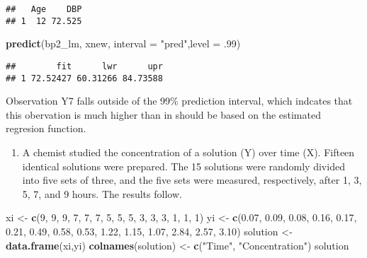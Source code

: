 \documentclass[
]{article}
\newenvironment{Shaded}{\begin{snugshade}}{\end{snugshade}}
\newcommand{\AttributeTok}[1]{\textcolor[rgb]{0.13,0.29,0.53}{#1}}
\newcommand{\DecValTok}[1]{\textcolor[rgb]{0.00,0.00,0.81}{#1}}
\newcommand{\FloatTok}[1]{\textcolor[rgb]{0.00,0.00,0.81}{#1}}
\newcommand{\FunctionTok}[1]{\textcolor[rgb]{0.13,0.29,0.53}{\textbf{#1}}}
\newcommand{\NormalTok}[1]{#1}
\newcommand{\OtherTok}[1]{\textcolor[rgb]{0.56,0.35,0.01}{#1}}
\newcommand{\StringTok}[1]{\textcolor[rgb]{0.31,0.60,0.02}{#1}}
\providecommand{\tightlist}{%
  \setlength{\itemsep}{0pt}\setlength{\parskip}{0pt}}
\begin{document}
\begin{verbatim}
##   Age    DBP
## 1  12 72.525
\end{verbatim}

\begin{Shaded}
\begin{Highlighting}[]
\FunctionTok{predict}\NormalTok{(bp2\_lm, xnew, }\AttributeTok{interval =} \StringTok{"pred"}\NormalTok{,}\AttributeTok{level =}\NormalTok{ .}\DecValTok{99}\NormalTok{)}
\end{Highlighting}
\end{Shaded}

\begin{verbatim}
##        fit      lwr      upr
## 1 72.52427 60.31266 84.73588
\end{verbatim}

Observation Y7 falls outside of the 99\% prediction interval, which
indcates that this obervation is much higher than in should be based on
the estimated regresion function.

\begin{enumerate}
\def\labelenumi{\arabic{enumi})}
\setcounter{enumi}{2}
\tightlist
\item
  A chemist studied the concentration of a solution (Y) over time (X).
  Fifteen identical solutions were prepared. The 15 solutions were
  randomly divided into five sets of three, and the five sets were
  measured, respectively, after 1, 3, 5, 7, and 9 hours. The results
  follow.
\end{enumerate}

\begin{Shaded}
\begin{Highlighting}[]
\NormalTok{xi }\OtherTok{\textless{}{-}} \FunctionTok{c}\NormalTok{(}\DecValTok{9}\NormalTok{, }\DecValTok{9}\NormalTok{, }\DecValTok{9}\NormalTok{, }\DecValTok{7}\NormalTok{, }\DecValTok{7}\NormalTok{, }\DecValTok{7}\NormalTok{, }\DecValTok{5}\NormalTok{, }\DecValTok{5}\NormalTok{, }\DecValTok{5}\NormalTok{, }\DecValTok{3}\NormalTok{, }\DecValTok{3}\NormalTok{, }\DecValTok{3}\NormalTok{, }\DecValTok{1}\NormalTok{, }\DecValTok{1}\NormalTok{, }\DecValTok{1}\NormalTok{)}
\NormalTok{yi }\OtherTok{\textless{}{-}} \FunctionTok{c}\NormalTok{(}\FloatTok{0.07}\NormalTok{, }\FloatTok{0.09}\NormalTok{, }\FloatTok{0.08}\NormalTok{, }\FloatTok{0.16}\NormalTok{, }\FloatTok{0.17}\NormalTok{, }\FloatTok{0.21}\NormalTok{, }\FloatTok{0.49}\NormalTok{, }\FloatTok{0.58}\NormalTok{, }\FloatTok{0.53}\NormalTok{, }\FloatTok{1.22}\NormalTok{, }\FloatTok{1.15}\NormalTok{, }\FloatTok{1.07}\NormalTok{, }\FloatTok{2.84}\NormalTok{, }\FloatTok{2.57}\NormalTok{, }\FloatTok{3.10}\NormalTok{)}
\NormalTok{solution }\OtherTok{\textless{}{-}} \FunctionTok{data.frame}\NormalTok{(xi,yi)}
\FunctionTok{colnames}\NormalTok{(solution) }\OtherTok{\textless{}{-}} \FunctionTok{c}\NormalTok{(}\StringTok{"Time"}\NormalTok{, }\StringTok{"Concentration"}\NormalTok{)}
\NormalTok{solution}
\end{Highlighting}
\end{Shaded}
\end{document}
